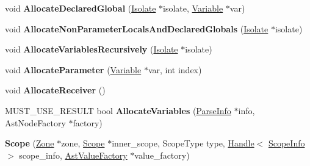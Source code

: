 \begin{DoxyCompactItemize}
\item 
void {\bfseries Allocate\+Declared\+Global} (\hyperlink{classv8_1_1internal_1_1_isolate}{Isolate} $\ast$isolate, \hyperlink{classv8_1_1internal_1_1_variable}{Variable} $\ast$var)\hypertarget{classv8_1_1internal_1_1_scope_a280e550ae18764837b324eeda03781a7}{}\label{classv8_1_1internal_1_1_scope_a280e550ae18764837b324eeda03781a7}

\item 
void {\bfseries Allocate\+Non\+Parameter\+Locals\+And\+Declared\+Globals} (\hyperlink{classv8_1_1internal_1_1_isolate}{Isolate} $\ast$isolate)\hypertarget{classv8_1_1internal_1_1_scope_ac7a2c05b46e385bb4a459d5bc378ba00}{}\label{classv8_1_1internal_1_1_scope_ac7a2c05b46e385bb4a459d5bc378ba00}

\item 
void {\bfseries Allocate\+Variables\+Recursively} (\hyperlink{classv8_1_1internal_1_1_isolate}{Isolate} $\ast$isolate)\hypertarget{classv8_1_1internal_1_1_scope_ac53e0d93c2412fe05ccc577e8337feba}{}\label{classv8_1_1internal_1_1_scope_ac53e0d93c2412fe05ccc577e8337feba}

\item 
void {\bfseries Allocate\+Parameter} (\hyperlink{classv8_1_1internal_1_1_variable}{Variable} $\ast$var, int index)\hypertarget{classv8_1_1internal_1_1_scope_aa1db3b450359383011429f10faeebbca}{}\label{classv8_1_1internal_1_1_scope_aa1db3b450359383011429f10faeebbca}

\item 
void {\bfseries Allocate\+Receiver} ()\hypertarget{classv8_1_1internal_1_1_scope_a700ac57a5846f017c3244c88396ebd04}{}\label{classv8_1_1internal_1_1_scope_a700ac57a5846f017c3244c88396ebd04}

\item 
M\+U\+S\+T\+\_\+\+U\+S\+E\+\_\+\+R\+E\+S\+U\+LT bool {\bfseries Allocate\+Variables} (\hyperlink{classv8_1_1internal_1_1_parse_info}{Parse\+Info} $\ast$info, Ast\+Node\+Factory $\ast$factory)\hypertarget{classv8_1_1internal_1_1_scope_a4b9216df07ee6195002accc30c96c1c6}{}\label{classv8_1_1internal_1_1_scope_a4b9216df07ee6195002accc30c96c1c6}

\item 
{\bfseries Scope} (\hyperlink{classv8_1_1internal_1_1_zone}{Zone} $\ast$zone, \hyperlink{classv8_1_1internal_1_1_scope}{Scope} $\ast$inner\+\_\+scope, Scope\+Type type, \hyperlink{classv8_1_1internal_1_1_handle}{Handle}$<$ \hyperlink{classv8_1_1internal_1_1_scope_info}{Scope\+Info} $>$ scope\+\_\+info, \hyperlink{classv8_1_1internal_1_1_ast_value_factory}{Ast\+Value\+Factory} $\ast$value\+\_\+factory)\hypertarget{classv8_1_1internal_1_1_scope_ac7b8f159698861b4b0b065b8897536d1}{}\label{classv8_1_1internal_1_1_scope_ac7b8f159698861b4b0b065b8897536d1}


\end{DoxyCompactItemize}
